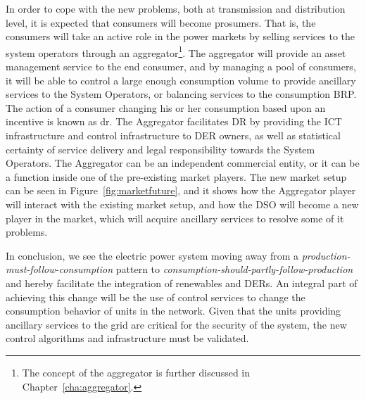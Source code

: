 In order to cope with the new problems, both at transmission and distribution level, it is expected that consumers will become prosumers. That is, the consumers will take an active role in the power markets by selling services to the system operators through an aggregator\footnote{The concept of the aggregator is further discussed in Chapter~\ref{cha:aggregator}.}. The aggregator will provide an asset management service to the end consumer, and by managing a pool of consumers, it will be able to control a large enough consumption volume to provide ancillary services to the System Operators, or balancing services to the consumption BRP. The action of a consumer changing his or her consumption based upon an incentive is known as \gls{dr}. The Aggregator facilitates DR by providing the ICT infrastructure and control infrastructure to DER owners, as well as statistical certainty of service delivery and legal responsibility towards the System Operators. The Aggregator can be an independent commercial entity, or it can be a function inside one of the pre-existing market players. The new market setup can be seen in Figure~\ref{fig:marketfuture}, and it shows how the Aggregator player will interact with the existing market setup, and how the DSO will become a new player in the market, which will acquire ancillary services to resolve some of it problems.

In conclusion, we see the electric power system moving away from a \emph{production-must-follow-consumption} pattern to \emph{consumption-should-partly-follow-production} and hereby facilitate the integration of renewables and DERs. An integral part of achieving this change will be the use of control services to change the consumption behavior of units in the network. Given that the units providing ancillary services to the grid are critical for the security of the system, the new control algorithms and infrastructure must be validated.


